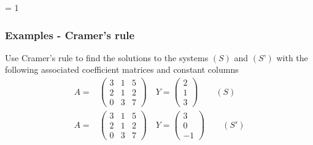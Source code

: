 \documentclass[usenames,dvipsnames,aspectratio=169,10pt]{beamer}
\def \EXAMPLEVERSION {3} %
\numberwithin{equation}{section}
\begin{document}
\ifnum \EXAMPLEVERSION = 1
\begin{frame}
\frametitle{Examples - Cramer's rule}

Use Cramer’s rule to find the solutions to the systems $(S)$ and $(S’)$ with the following associated coefficient matrices and constant columns
\begin{align*}
A =& 
\begin{pmatrix}
3 & 1 & 5 \\
2 & 1 & 2 \\
0 & 3 & 7 
\end{pmatrix}
\quad
Y = 
\begin{pmatrix}
2 \\ 1 \\ 3
\end{pmatrix}
\qquad (S)
\\
A =& 
\begin{pmatrix}
3 & 1 & 5 \\
2 & 1 & 2 \\
0 & 3 & 7 
\end{pmatrix}
\quad
Y = 
\begin{pmatrix}
3 \\ 0 \\ -1
\end{pmatrix}
\qquad (S')
\end{align*}
\end{frame}
\end{document}
